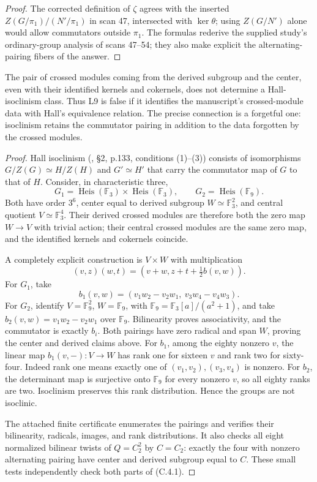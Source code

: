 \begin{proof}
The corrected definition of $\zeta$ agrees with the inserted
$Z(G/\pi_1)/(N'/\pi_1)$ in scan 47, intersected with $\ker\theta$; using
$Z(G/N')$ alone would allow commutators outside $\pi_1$. The formulas
rederive the supplied study's ordinary-group analysis of scans 47--54;
they also make explicit the alternating-pairing fibers of the answer.
\end{proof}

\begin{proposition}
\label{C:isoclinism_counterexample}
The pair of crossed modules coming from the derived subgroup and the center,
even with their identified kernels and cokernels, does not determine a
Hall-isoclinism class. Thus L9 is false if it identifies the manuscript's
crossed-module data with Hall's equivalence relation. The precise connection
is a forgetful one: isoclinism retains the commutator pairing in addition to
the data forgotten by the crossed modules.
\end{proposition}
\begin{proof}
Hall isoclinism (\cite{C-Hall1940}, \S2, p.133, conditions (1)--(3)) consists of isomorphisms $G/Z(G)\simeq H/Z(H)$ and
$G'\simeq H'$ that carry the commutator map of $G$ to that of $H$.
Consider, in characteristic three,
\[
 G_1=\operatorname{Heis}(\mathbb F_3)\times
          \operatorname{Heis}(\mathbb F_3),\qquad
 G_2=\operatorname{Heis}(\mathbb F_9).
\]
Both have order $3^6$, center equal to derived subgroup
$W\simeq\mathbb F_3^2$, and central quotient $V\simeq\mathbb F_3^4$.
Their derived crossed modules are therefore both the zero map
$W\to V$ with trivial action; their central crossed modules are the same
zero map, and the identified kernels and cokernels coincide.

A completely explicit construction is $V\times W$ with multiplication
\[
 (v,z)(w,t)=(v+w,z+t+\tfrac12 b(v,w)).
\]
For $G_1$, take
\[
 b_1(v,w)=(v_1w_2-v_2w_1,\ v_3w_4-v_4w_3).
\]
For $G_2$, identify $V=\mathbb F_9^2$, $W=\mathbb F_9$, with
$\mathbb F_9=\mathbb F_3[a]/(a^2+1)$, and take
$b_2(v,w)=v_1w_2-v_2w_1$ over $\mathbb F_9$.
Bilinearity proves associativity, and the commutator is exactly $b_i$.
Both pairings have zero radical and span $W$, proving the center and derived
claims above. For $b_1$, among the eighty nonzero $v$, the linear map
$b_1(v,-):V\to W$ has rank one for sixteen $v$ and rank two for sixty-four.
Indeed rank one means exactly one of $(v_1,v_2),(v_3,v_4)$ is nonzero.
For $b_2$, the determinant map is surjective onto $\mathbb F_9$ for every
nonzero $v$, so all eighty ranks are two. Isoclinism preserves this rank
distribution. Hence the groups are not isoclinic.

The attached finite certificate enumerates the pairings and verifies their
bilinearity, radicals, images, and rank distributions. It also checks all
eight normalized bilinear twists of $Q=C_2^2$ by $C=C_2$: exactly the four
with nonzero alternating pairing have center and derived subgroup equal to
$C$. These small tests independently check both parts of (C.4.1).
\end{proof}

